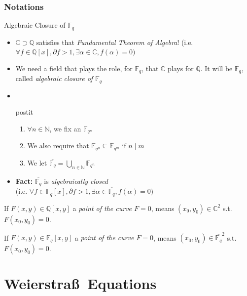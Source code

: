 \documentclass[handout]{beamer}%
\newcommand{\Q}{\mathbb Q}
\newcommand{\N}{\mathbb N}
\newcommand{\F}{\mathbb F}
\newcommand{\C}{\mathbb C}
\theoremstyle{definition}
\begin{document}
\begin{frame}[label=current]
\frametitle{Notations}
%
 \begin{block}{Algebraic Closure of $\F_q$}\pause
 \begin{itemize}[<+-| alert@+>] %
  \item $\C\supset\Q$ satisfies that \emph{Fundamental Theorem of Algebra}! (i.e. $\forall f\in\Q[x], \partial f>1, \exists\alpha\in\C,
 f(\alpha)=0)$
  \item We need a field that plays the role, for $\F_q$, that $\C$ plays for $\Q$. It will be $\overline{\F_q}$, called
\emph{algebraic closure of $\F_q$}
 \item[] \ \hfil 
 \begin{beamercolorbox}[rounded=true,shadow=true,wd=6.5cm]{postit}
         \begin{enumerate}
          \item $\forall n\in\N$, we fix an $\F_{q^n}$
          \item We also require that $\F_{q^n}\subseteq\F_{q^m}$ if $n\mid m$
          \item We let $\overline{\F_q}=\displaystyle\bigcup_{n\in\N}\F_{q^n}$
         \end{enumerate}
\end{beamercolorbox}
 \item
  \textbf{Fact:} $\overline{\F_q}$ is \emph{algebraically closed}\\ (i.e. $\forall f\in\F_q[x], \partial f>1, \exists\alpha\in\overline{\F_q},
 f(\alpha)=0)$
 \end{itemize}
 \end{block}
\begin{scriptsize}
If $F(x,y)\in\Q[x,y]$ a \emph{point of the curve $F=0$}, means $(x_0,y_0)\in\C^2$ s.t.
$F(x_0,y_0)=0$. \pause

If $F(x,y)\in\F_q[x,y]$ a \emph{point of the curve $F=0$}, means $(x_0,y_0)\in\overline{\F_q}^2$ s.t.
$F(x_0,y_0)=0$.
\end{scriptsize}
\end{frame}


\section{Weierstra\ss\ Equations}
\end{document}
